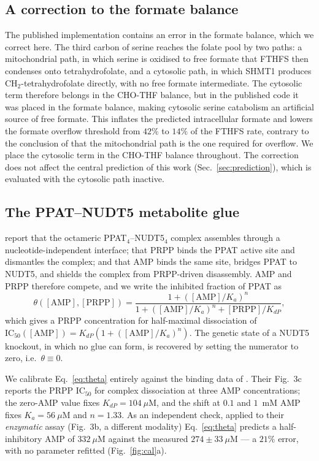 \documentclass[a4paper,fleqn]{cas-sc}
\begin{document}
\subsection{A correction to the formate balance}
\label{sec:correction}

The published implementation contains an error in the formate balance, which we
correct here. The third carbon of serine reaches the folate pool by two paths: a
mitochondrial path, in which serine is oxidised to free formate that FTHFS then
condenses onto tetrahydrofolate, and a cytosolic path, in which SHMT1 produces
CH$_2$-tetrahydrofolate directly, with no free formate intermediate. The
cytosolic term therefore belongs in the CHO-THF balance, but in the published
code it was placed in the formate balance, making cytosolic serine catabolism an
artificial source of free formate. This inflates the predicted intracellular
formate and lowers the formate overflow threshold from $42\%$ to $14\%$ of the
FTHFS rate, contrary to the conclusion of \citet{oizel2020} that the
mitochondrial path is the one required for overflow. We place the cytosolic term
in the CHO-THF balance throughout. The correction does not affect the central
prediction of this work (Sec.~\ref{sec:prediction}), which is evaluated with the
cytosolic path inactive.

\subsection{The PPAT--NUDT5 metabolite glue}

\citet{witus2026} report that the octameric PPAT$_4$--NUDT5$_4$ complex assembles
through a nucleotide-independent interface; that PRPP binds the PPAT active site
and dismantles the complex; and that AMP binds the same site, bridges PPAT to
NUDT5, and shields the complex from PRPP-driven disassembly. AMP and PRPP
therefore compete, and we write the inhibited fraction of PPAT as
\begin{equation}
\theta([\mathrm{AMP}],[\mathrm{PRPP}])
= \frac{1+\left([\mathrm{AMP}]/K_a\right)^{n}}
{1+\left([\mathrm{AMP}]/K_a\right)^{n}+[\mathrm{PRPP}]/K_{dP}},
\label{eq:theta}
\end{equation}
which gives a PRPP concentration for half-maximal dissociation of
$\mathrm{IC}_{50}([\mathrm{AMP}])=K_{dP}(1+([\mathrm{AMP}]/K_a)^n)$. The genetic
state of a NUDT5 knockout, in which no glue can form, is recovered by setting the
numerator to zero, i.e.\ $\theta\equiv0$.

We calibrate Eq.~\eqref{eq:theta} entirely against the binding data of
\citet{witus2026}. Their Fig.~3c reports the PRPP IC$_{50}$ for complex
dissociation at three AMP concentrations; the zero-AMP value fixes
$K_{dP}=104~\mu$M, and the shift at $0.1$ and $1$~mM AMP fixes
$K_a=56~\mu$M and $n=1.33$. As an independent check, applied to their
\emph{enzymatic} assay (Fig.~3b, a different modality) Eq.~\eqref{eq:theta}
predicts a half-inhibitory AMP of $332~\mu$M against the measured
$274\pm33~\mu$M --- a $21\%$ error, with no parameter refitted
(Fig.~\ref{fig:cal}a).
\end{document}
